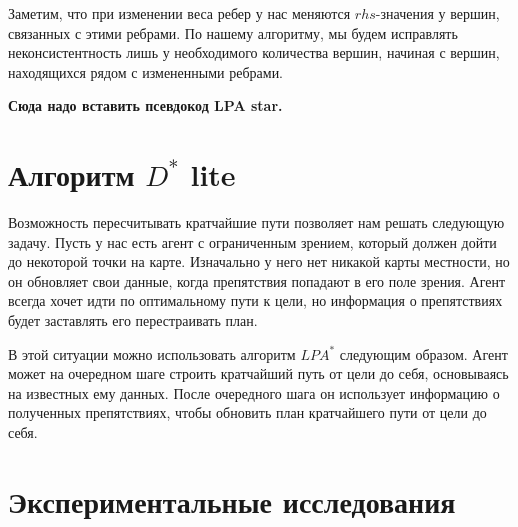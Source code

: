 \documentclass[11pt]{article}
\begin{document}
    Заметим, что при изменении веса ребер у нас меняются $rhs$-значения у вершин, связанных с этими ребрами.
    По нашему алгоритму, мы будем исправлять неконсистентность лишь у необходимого количества вершин, начиная с вершин, находящихся рядом с измененными ребрами.

    \textbf{\LARGE Сюда надо вставить псевдокод LPA star.}


    \section{Алгоритм $D^*$ lite}
    Возможность пересчитывать кратчайшие пути позволяет нам решать следующую задачу.
    Пусть у нас есть агент с ограниченным зрением, который должен дойти до некоторой точки на карте.
    Изначально у него нет никакой карты местности, но он обновляет свои данные, когда препятствия попадают в его поле зрения.
    Агент всегда хочет идти по оптимальному пути к цели, но информация о препятствиях будет заставлять его перестраивать план.

    В этой ситуации можно использовать алгоритм $LPA^*$ следующим образом.
    Агент может на очередном шаге строить кратчайший путь от цели до себя, основываясь на известных ему данных.
    После очередного шага он использует информацию о полученных препятствиях, чтобы обновить план кратчайшего пути от цели до себя.


    \section{Экспериментальные исследования}
\end{document}
